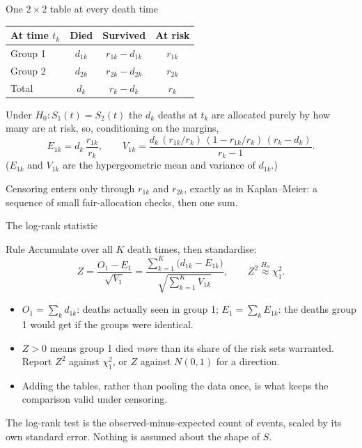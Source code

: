\documentclass[aspectratio=169,11pt]{beamer}
\begin{document}
\begin{frame}{One $2\times2$ table at every death time}
  \footnotesize
  \begin{center}\scriptsize
  \begin{tabular}{l|cc|c}
    \toprule
    At time $t_k$ & Died & Survived & At risk \\
    \midrule
    Group 1 & $d_{1k}$ & $r_{1k}-d_{1k}$ & $r_{1k}$ \\
    Group 2 & $d_{2k}$ & $r_{2k}-d_{2k}$ & $r_{2k}$ \\
    \midrule
    Total & $d_k$ & $r_k-d_k$ & $r_k$ \\
    \bottomrule
  \end{tabular}
  \end{center}
  \begin{readme}
    Under $H_0: S_1(t)=S_2(t)$ the $d_k$ deaths at $t_k$ are allocated purely by how many
    are at risk, so, conditioning on the margins,
    \[
      E_{1k}=d_k\,\frac{r_{1k}}{r_k},
      \qquad
      V_{1k}=\frac{d_k\,(r_{1k}/r_k)\,(1-r_{1k}/r_k)\,(r_k-d_k)}{r_k-1}.
    \]
    ($E_{1k}$ and $V_{1k}$ are the hypergeometric mean and variance of $d_{1k}$.)
  \end{readme}
  \begin{takeaway}
    Censoring enters only through $r_{1k}$ and $r_{2k}$, exactly as in Kaplan--Meier: a
    sequence of small fair-allocation checks, then one sum.
  \end{takeaway}
\end{frame}

\begin{frame}{The log-rank statistic}
  \scriptsize
  \begin{block}{Rule}
    Accumulate over all $K$ death times, then standardise:
    \[
      \boxed{\;
        Z=\frac{O_1-E_1}{\sqrt{V_1}}
         =\frac{\sum_{k=1}^{K}\bigl(d_{1k}-E_{1k}\bigr)}{\sqrt{\sum_{k=1}^{K}V_{1k}}},
        \qquad Z^2 \stackrel{H_0}{\approx} \chi^2_1 .\;}
    \]
  \end{block}
  \begin{readme}
    \begin{itemize}
      \item $O_1=\sum_k d_{1k}$: deaths actually seen in group 1; $E_1=\sum_k E_{1k}$: the
            deaths group 1 would get if the groups were identical.
      \item $Z>0$ means group 1 died \emph{more} than its share of the risk sets warranted.
            Report $Z^2$ against $\chi^2_1$, or $Z$ against $N(0,1)$ for a direction.
      \item Adding the tables, rather than pooling the data once, is what keeps the
            comparison valid under censoring.
    \end{itemize}
  \end{readme}
  \begin{takeaway}
    The log-rank test is the observed-minus-expected count of events, scaled by
    its own standard error. Nothing is assumed about the shape of $S$.
  \end{takeaway}
\end{frame}
\end{document}
